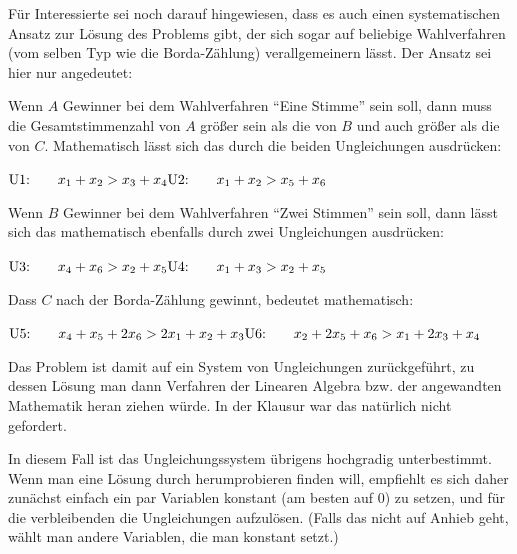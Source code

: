 \documentclass[10pt, a4paper, german]{article}
\numberwithin {equation}{section}
\begin{document}
Für Interessierte sei noch darauf hingewiesen, dass es auch einen
systematischen Ansatz zur Lösung des Problems gibt, der sich sogar auf
beliebige Wahlverfahren (vom selben Typ wie die Borda-Zählung)
verallgemeinern lässt. Der Ansatz sei hier nur angedeutet:

\vspace{0.2cm}
Wenn $A$ Gewinner bei dem Wahlverfahren ``Eine Stimme'' sein soll,
dann muss die Gesamtstimmenzahl von $A$ größer sein als die von $B$
und auch größer als die von $C$.  Mathematisch lässt sich das durch
die beiden Ungleichungen ausdrücken:

\vspace{0.2cm}
\begin{math}
\mbox{U1:} \qquad x_1 + x_2 > x_3 + x_4 \\
\mbox{U2:} \qquad x_1 + x_2 > x_5 + x_6 
\end{math}

\vspace{0.2cm}
Wenn $B$ Gewinner bei dem Wahlverfahren ``Zwei Stimmen'' sein soll, 
dann lässt sich das mathematisch ebenfalls durch zwei Ungleichungen ausdrücken:

\vspace{0.2cm}
\begin{math}
\mbox{U3:} \qquad x_4 + x_6 > x_2 + x_5 \\
\mbox{U4:} \qquad x_1 + x_3 > x_2 + x_5 
\end{math}

\vspace{0.2cm}
Dass $C$ nach der Borda-Zählung gewinnt, bedeutet mathematisch:

\vspace{0.2cm}
\begin{math}
\mbox{U5:} \qquad x_4 + x_5 + 2x_6 > 2x_1 + x_2 + x_3 \\
\mbox{U6:} \qquad x_2 + 2x_5 + x_6 > x_1 + 2x_3 + x_4 
\end{math}

\vspace{0.2cm}

Das Problem ist damit auf ein System von Ungleichungen zurückgeführt,
zu dessen Lösung man dann Verfahren der Linearen Algebra bzw. der
angewandten Mathematik heran ziehen würde. In der Klausur war das
natürlich nicht gefordert. 

In diesem Fall ist das Ungleichungssystem übrigens hochgradig unterbestimmt.
Wenn man eine Lösung durch herumprobieren finden will, empfiehlt es sich daher
zunächst einfach ein par Variablen konstant (am besten auf 0) zu setzen, und
für die verbleibenden die Ungleichungen aufzulösen. (Falls das nicht auf
Anhieb geht, wählt man andere Variablen, die man konstant setzt.)
\end{document}
